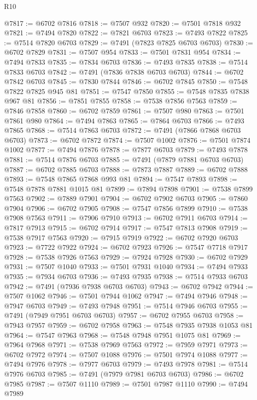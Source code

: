 \begin{lexlean}{R10}
\begin{coremodule}
@7817 := @6702 @7816
@7818 := @7507 @932
@7820 := @7501 @7818 @932
@7821 := @7494 @7820
@7822 := @7821 @6703
@7823 := @7493 @7822
@7825 := @7514 @7820 @6703
@7829 := @7491 (@7823 @7825 @6703 @6703)
@7830 := @6702 @7829
@7831 := @7507 @954
@7833 := @7501 @7831 @954
@7834 := @7494 @7833
@7835 := @7834 @6703
@7836 := @7493 @7835
@7838 := @7514 @7833 @6703
@7842 := @7491 (@7836 @7838 @6703 @6703)
@7844 := @6702 @7842 @6703
@7845 := @7830 @7844
@7846 := @6702 @7845
@7850 := @7548 @7822 @7825 @945 @81
@7851 := @7547 @7850
@7855 := @7548 @7835 @7838 @967 @81
@7856 := @7851 @7855
@7858 := @7538 @7856 @7563
@7859 := @7846 @7858
@7860 := @6702 @7859
@7861 := @7507 @980
@7863 := @7501 @7861 @980
@7864 := @7494 @7863
@7865 := @7864 @6703
@7866 := @7493 @7865
@7868 := @7514 @7863 @6703
@7872 := @7491 (@7866 @7868 @6703 @6703)
@7873 := @6702 @7872
@7874 := @7507 @1002
@7876 := @7501 @7874 @1002
@7877 := @7494 @7876
@7878 := @7877 @6703
@7879 := @7493 @7878
@7881 := @7514 @7876 @6703
@7885 := @7491 (@7879 @7881 @6703 @6703)
@7887 := @6702 @7885 @6703
@7888 := @7873 @7887
@7889 := @6702 @7888
@7893 := @7548 @7865 @7868 @993 @81
@7894 := @7547 @7893
@7898 := @7548 @7878 @7881 @1015 @81
@7899 := @7894 @7898
@7901 := @7538 @7899 @7563
@7902 := @7889 @7901
@7904 := @6702 @7902 @6703
@7905 := @7860 @7904
@7906 := @6702 @7905
@7908 := @7547 @7856 @7899
@7910 := @7538 @7908 @7563
@7911 := @7906 @7910
@7913 := @6702 @7911 @6703
@7914 := @7817 @7913
@7915 := @6702 @7914
@7917 := @7547 @7813 @7908
@7919 := @7538 @7917 @7563
@7920 := @7915 @7919
@7922 := @6702 @7920 @6703
@7923 := @7722 @7922
@7924 := @6702 @7923
@7926 := @7547 @7718 @7917
@7928 := @7538 @7926 @7563
@7929 := @7924 @7928
@7930 := @6702 @7929
@7931 := @7507 @1040
@7933 := @7501 @7931 @1040
@7934 := @7494 @7933
@7935 := @7934 @6703
@7936 := @7493 @7935
@7938 := @7514 @7933 @6703
@7942 := @7491 (@7936 @7938 @6703 @6703)
@7943 := @6702 @7942
@7944 := @7507 @1062
@7946 := @7501 @7944 @1062
@7947 := @7494 @7946
@7948 := @7947 @6703
@7949 := @7493 @7948
@7951 := @7514 @7946 @6703
@7955 := @7491 (@7949 @7951 @6703 @6703)
@7957 := @6702 @7955 @6703
@7958 := @7943 @7957
@7959 := @6702 @7958
@7963 := @7548 @7935 @7938 @1053 @81
@7964 := @7547 @7963
@7968 := @7548 @7948 @7951 @1075 @81
@7969 := @7964 @7968
@7971 := @7538 @7969 @7563
@7972 := @7959 @7971
@7973 := @6702 @7972
@7974 := @7507 @1088
@7976 := @7501 @7974 @1088
@7977 := @7494 @7976
@7978 := @7977 @6703
@7979 := @7493 @7978
@7981 := @7514 @7976 @6703
@7985 := @7491 (@7979 @7981 @6703 @6703)
@7986 := @6702 @7985
@7987 := @7507 @1110
@7989 := @7501 @7987 @1110
@7990 := @7494 @7989

\end{coremodule}
\end{lexlean}
